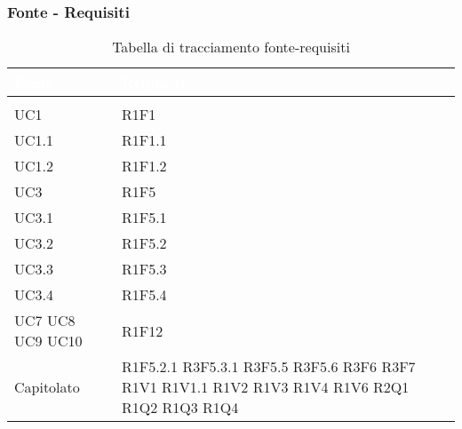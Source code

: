 \subsubsection{Fonte - Requisiti}
\renewcommand{\arraystretch}{1.5}
\begin{center}
\begin{longtable}{C{6cm} C{6cm}}
		\textcolor{white}{\textbf{Fonte}} & 
		\textcolor{white}{\textbf{Requisiti}}\\
		\endfirsthead
	    \\
	    \endfoot
	    \caption{Tabella di tracciamento fonte-requisiti}
	    \endlastfoot

UC1 &  	R1F1\\
UC1.1 & R1F1.1\\
UC1.2 & R1F1.2\\
UC3 & 	R1F5\\
UC3.1 & R1F5.1\\
UC3.2 & R1F5.2\\
UC3.3 & R1F5.3\\
UC3.4 & R1F5.4\\
			  
UC7 \newline UC8 \newline UC9 \newline UC10 \newline & R1F12 \\

Capitolato &  	R1F5.2.1 \newline
				R3F5.3.1 \newline
				R3F5.5 \newline
				R3F5.6 \newline
				R3F6 \newline
				R3F7 \newline
				R1V1 \newline
				R1V1.1 \newline
				R1V2 \newline
				R1V3 \newline
				R1V4 \newline
				R1V6 \newline
				R2Q1 \newline
				R1Q2 \newline
				R1Q3 \newline
				R1Q4 \\


\end{longtable}
\end{center}
